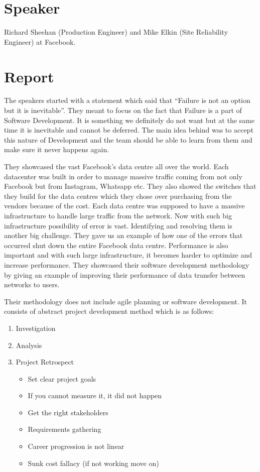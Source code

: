 
\section{Speaker}

Richard Sheehan (Production Engineer) and Mike Elkin (Site Reliability Engineer) at Facebook.

\section{Report}

The speakers started with a statement which said that ``Failure is not an option but it is inevitable''. They meant to focus on the fact that Failure is a part of Software Development. It is something we definitely do not want but at the same time it is inevitable and cannot be deferred. The main idea behind was to accept this nature of Development and the team should be able to learn from them and make sure it never happens again. 

They showcased the vast Facebook's data centre all over the world. Each datacenter was built in order to manage massive traffic coming from not only Facebook but from Instagram, Whatsapp etc. They also showed the switches that they build for the data centres which they chose over purchasing from the vendors because of the cost. Each data centre was supposed to have a massive infrastructure to handle large traffic from the network. Now with such big infrastructure possibility of error is vast. Identifying and resolving them is another big challenge. They gave us an example of how one of the errors that occurred shut down the entire Facebook data centre. Performance is also important and with such large infrastructure, it becomes harder to optimize and increase performance. They showcased their software development methodology by giving an example of improving their performance of data transfer between networks to users.

Their methodology does not include agile planning or software development. It consists of abstract project development method which is as follows:
\begin{enumerate}
      \item Investigation
      \item Analysis
      \item Project Retrospect
      \begin{itemize}
            \item Set clear project goals
            \item If you cannot measure it, it did not happen
            \item Get the right stakeholders
            \item Requirements gathering
            \item Career progression is not linear
            \item Sunk cost fallacy (if not working move on)
      \end{itemize}
\end{enumerate}

